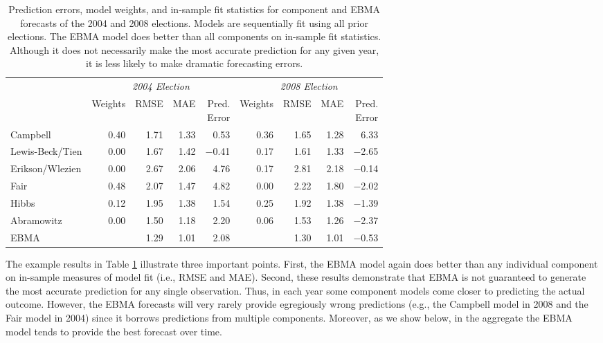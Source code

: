 \documentclass[pdftex,12pt,fullpage,oneside]{amsart}
\begin{document}
\begin{table}[ht!]
  \caption{\footnotesize Prediction errors, model weights, and in-sample fit
    statistics for component and EBMA forecasts of the 2004 and 2008
    elections.  Models are sequentially fit using all prior elections.
    The EBMA model does better than all components on in-sample fit
    statistics.  Although it does not necessarily make the most accurate
    prediction for any given year, it is less likely to make
    dramatic forecasting errors.}
\label{Pres-Year-Res} \small
\begin{center}
\begin{tabular}{l rrrrrrrr}	
  \toprule
   &\multicolumn{4}{c}{\textit{2004 Election}} &\multicolumn{4}{c}{\textit{2008 Election}} \\ 
 &	Weights&	RMSE &MAE &\shortstack{Pred. \\ Error}
 &Weights&	RMSE&	MAE &  \shortstack{Pred.\\  Error}\\
\midrule
 Campbell               &0.40&1.71&1.33 &0.53&0.36&1.65&1.28&6.33\\
  Lewis-Beck/Tien 	&0.00&1.67&1.42&$-$0.41&	0.17&1.61&1.33&$-$2.65\\
  Erikson/Wlezien 	&0.00&2.67&2.06&4.76&0.17&2.81&2.18&$-$0.14\\
  Fair                      	&0.48&2.07&1.47&4.82&0.00&2.22&1.80&$-$2.02 \\
  Hibbs                   	&0.12&1.95&1.38&1.54&0.25&1.92&1.38&$-$1.39\\
  Abramowitz        	&0.00&1.50&1.18&2.20&0.06&1.53&1.26&$-$2.37\\
  EBMA                    	&	       	&1.29&1.01&2.08&
  &1.30&1.01&$-$0.53\\
\bottomrule
\end{tabular}
 \end{center}
 \end{table}


The example results in Table \ref{Pres-Year-Res} illustrate three
important points.  First, the EBMA model again does better than any
individual component on in-sample measures of model fit (i.e., RMSE
and MAE).  Second, these results demonstrate that EBMA is not
guaranteed to generate the most accurate prediction for any single
observation.  Thus, in each year some component models come closer to
predicting the actual outcome.  However, the EBMA forecasts will very
rarely provide egregiously wrong predictions (e.g., the Campbell model
in 2008 and the Fair model in 2004) since it borrows predictions from
multiple components.  Moreover, as we show below, in the aggregate the
EBMA model tends to provide the best forecast over time.
\end{document}
